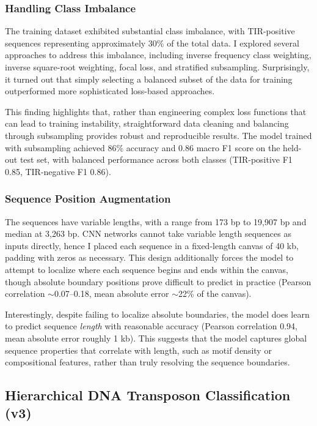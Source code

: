 \documentclass[12pt]{article}
\begin{document}
\subsubsection{Handling Class Imbalance}

The training dataset exhibited substantial class imbalance, with TIR-positive sequences representing approximately 30\% of the total data. I explored several approaches to address this imbalance, including inverse frequency class weighting, inverse square-root weighting, focal loss, and stratified subsampling. Surprisingly, it turned out that simply selecting a balanced subset of the data for training outperformed more sophisticated loss-based approaches.

This finding highlights that, rather than engineering complex loss functions that can lead to training instability, straightforward data cleaning and balancing through subsampling provides robust and reproducible results. The model trained with subsampling achieved 86\% accuracy and 0.86 macro F1 score on the held-out test set, with balanced performance across both classes (TIR-positive F1 0.85, TIR-negative F1 0.86).

\subsubsection{Sequence Position Augmentation}

The sequences have variable lengths, with a range from 173 bp to 19,907 bp and median at 3,263 bp. CNN networks cannot take variable length sequences as inputs directly, hence I placed each sequence in a fixed-length canvas of 40 kb, padding with zeros as necessary. This design additionally forces the model to attempt to localize where each sequence begins and ends within the canvas, though absolute boundary positions prove difficult to predict in practice (Pearson correlation $\sim$0.07--0.18, mean absolute error $\sim$22\% of the canvas).

Interestingly, despite failing to localize absolute boundaries, the model does learn to predict sequence \emph{length} with reasonable accuracy (Pearson correlation 0.94, mean absolute error roughly 1 kb). This suggests that the model captures global sequence properties that correlate with length, such as motif density or compositional features, rather than truly resolving the sequence boundaries.


\subsection{Hierarchical DNA Transposon Classification (v3)}\label{ssec:hier}
\end{document}
